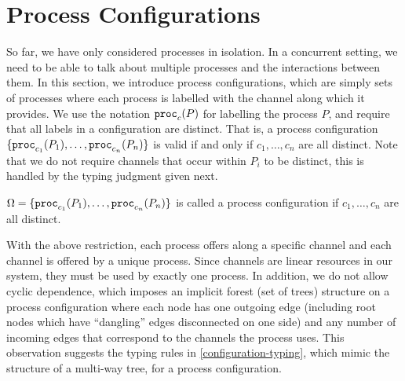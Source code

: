 
\section{Process Configurations}
\label{chapter/session-types/configurations}

So far, we have only considered processes in isolation. In a concurrent setting, we need to be able to talk about multiple processes and the interactions between them. In this section, we introduce process configurations, which are simply sets of processes where each process is labelled with the channel along which it provides. We use the notation $\mathtt{proc}_{c}(P)$ for labelling the process $P$, and require that all labels in a configuration are distinct. That is, a process configuration $\lbrace\mathtt{proc}_{c_1}(P_1), \ldots, \mathtt{proc}_{c_n}(P_n)\rbrace$ is valid if and only if $c_1, \ldots, c_n$ are all distinct. Note that we do not require channels that occur within $P_i$ to be distinct, this is handled by the typing judgment given next.

\begin{definition}
  $\Omega = \lbrace\mathtt{proc}_{c_1}(P_1), \ldots, \mathtt{proc}_{c_n}(P_n)\rbrace$ is called a process configuration if $c_1, \ldots, c_n$ are all distinct.
\end{definition}

With the above restriction, each process offers along a specific channel and each channel is offered by a unique process. Since channels are linear resources in our system, they must be used by exactly one process. In addition, we do not allow cyclic dependence, which imposes an implicit forest (set of trees) structure on a process configuration where each node has one outgoing edge (including root nodes which have ``dangling'' edges disconnected on one side) and any number of incoming edges that correspond to the channels the process uses. This observation suggests the typing rules in \cref{configuration-typing}, which mimic the structure of a multi-way tree, for a process configuration.


